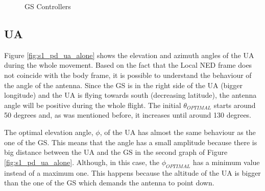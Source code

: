 \begin{figure}[H]
	\hfill
	\hfill
	\caption{GS Controllers}
	\label{fig:s1_gs}
\end{figure}

\subsection{UA}
Figure \ref{fig:s1_pd_ua_alone} shows the elevation and azimuth angles of the UA during the whole movement. Based on the fact that the Local NED frame does not coincide with the body frame, it is possible to understand the behaviour of the angle of the antenna. Since the GS is in the right side of the UA (bigger longitude) and the UA is flying towards south (decreasing latitude), the antenna angle will be positive during the whole flight.
The initial $\theta_{OPTIMAL}$ starts around 50 degrees and, as was mentioned before, it increases until around 130 degrees.

The optimal elevation angle, $\phi$, of the UA has almost the same behaviour as the one of the GS. This means that the angle has a small amplitude because there is big distance between the UA and the GS in the second graph of Figure \ref{fig:s1_pd_ua_alone}. Although, in this case, the $\phi_{OPTIMAL}$ has a minimum value instead of a maximum one. This happens because the altitude of the UA is bigger than the one of the GS which demands the antenna to point down.


